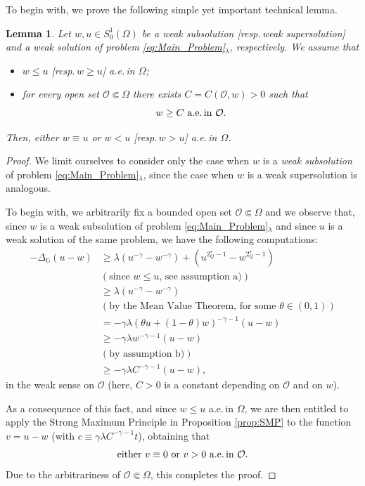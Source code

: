 \documentclass[11pt]{amsart}
\numberwithin{equation}{section} %
\newtheorem{lemma}[teo]{Lemma}
\theoremstyle{definition}
\def\Oo{\mathcal O}
\begin{document}
To begin with, we prove the following simple yet important technical lemma.
\begin{lemma} \label{lem:SMPsoprasotto}
	Let $w,u\in S^{1}_{0}(\Omega)$ be a \emph{weak subsolution} 
	\emph{[}resp.\,\emph{weak supersolution}\emph{]}
	and a \emph{weak solution} of pro\-blem \eqref{eq:Main_Problem}$_\lambda$, respectively.
	We assume that
	\begin{itemize}
		\item[a)] $w\leq u$ \emph{[}resp.\,$w\geq u$\emph{]} a.e.\,in $\Omega$;
		\item[b)] for every open set $\Oo\Subset\Omega$ there exists $C = C(\Oo,w) > 0$ such that
		$$\text{$w \geq C$ a.e.\,in $\Oo$}.$$
	\end{itemize}
	Then, either $w\equiv u$ or $w<u$ \emph{[}resp.\,$w > u$\emph{]} a.e.\,in $\Omega$.
\end{lemma}
\begin{proof}
	We limit ourselves to consider only the case when $w$ is a \emph{weak subsolution} of 
	pro\-blem \eqref{eq:Main_Problem}$_\lambda$, since the case when $w$ is a
	weak supersolution is analogous.
	
	To begin with, we arbitrarily fix a bounded open set $\Oo\Subset\Omega$ and we observe that, since $w$ 
	is a weak subsolution of problem \eqref{eq:Main_Problem}$_\lambda$ and since $u$
	is a weak solution of the same problem, we have the following computations:
	\begin{align*}
		-\Delta_{\mathbb{G}} (u-w) & \geq \lambda(u^{-\gamma}-w^{-\gamma})
		+(u^{2^{\star}_{Q}-1}-w^{2^{\star}_{Q}-1}) \\
		& (\text{since $w\leq u$, see assumption a)}) \\
		& \geq \lambda({u}^{-\gamma}-w^{-\gamma}) \\
		& (\text{by the Mean Value Theorem, for some $\theta\in(0,1)$}) \\
		& = -\gamma\lambda(\theta {u}+(1-\theta)w)^{-\gamma-1}(u-w) \\
		& \geq -\gamma\lambda w^{-\gamma-1}(u-w) \\
		& (\text{by assumption b)}) \\
		& \geq -\gamma\lambda C^{-\gamma-1}(u-w),
	\end{align*}
	in the weak sense on $\Oo$
	(here, $C > 0$ is a constant depending on $\Oo$ and on $w$). 
	
	As a consequence of this fact,
	and since $w\leq u$ a.e.\,in $\Omega$, we are then entitled
	to apply the Strong Maximum Principle in Proposition \ref{prop:SMP} to the
	function $v = u-w$ (with $c \equiv \gamma\lambda C^{-\gamma-1}t$),
	obtaining that
	$$\text{either $v\equiv 0$ or $v > 0$ a.e.\,in $\Oo$}.$$
	Due to the arbitrariness of $\Oo\Subset\Omega$, this completes the proof.
\end{proof}
\end{document}
